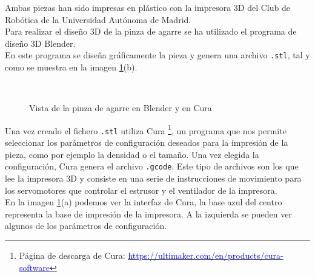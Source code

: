 \documentclass[twoside, 11pt]{epstfg}
\begin{document}
Ambas piezas han sido impresas en plástico con la impresora 3D del Club de Robótica de la Universidad Autónoma de Madrid.\\
Para realizar el diseño 3D de la pinza de agarre se ha utilizado el programa de diseño 3D Blender.\\
En este programa se diseña gráficamente la pieza y genera una archivo \texttt{.stl}, tal y como se muestra en la imagen \ref{Cura:blender}(b). 
\begin{figure}[H]
	\centering
	
	\hspace{1.5cm}
	 \\
	
	\caption{Vista de la pinza de agarre en Blender y en Cura}
	\label{Cura:blender} 
\end{figure}

Una vez creado el fichero \texttt{.stl} utiliza Cura \footnote{Página de descarga de Cura: \href{https://ultimaker.com/en/products/cura-software}{\textcolor{blue}{https://ultimaker.com/en/products/cura-software}}}, un programa que nos permite seleccionar los parámetros de configuración deseados para la impresión de la pieza, como por ejemplo la densidad o el tamaño. Una vez elegida la configuración, Cura genera el archivo \texttt{.gcode}. Este tipo de archivos son los que lee la impresora 3D y consiste en una serie de instrucciones de movimiento para los servomotores que controlar el estrusor y el ventilador de la impresora.\\
En la imagen \ref{Cura:blender}(a) podemos ver la interfaz de Cura, la base azul del centro representa la base de impresión de la impresora. A la izquierda se pueden ver algunos de los parámetros de configuración.
\end{document}
